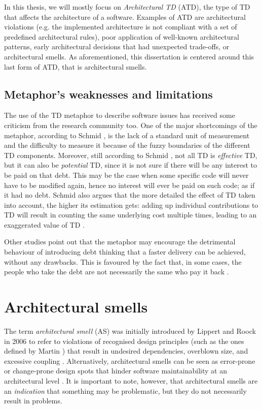 In this thesis, we will mostly focus on \emph{Architectural TD} (ATD), the type of TD that affects the architecture of a software.
Examples of ATD are architectural violations (e.g. the implemented architecture is not compliant with a set of predefined architectural rules), poor application of well-known architectural patterns, early architectural decisions that had unexpected trade-offs, or architectural smells.
As aforementioned, this dissertation is centered around this last form of ATD, that is architectural smells.

\subsection{Metaphor's weaknesses and limitations}
The use of the TD metaphor to describe software issues has received some criticism from the research community too.
One of the major shortcomings of the metaphor, according to Schmid \cite{Schmid2013}, is the lack of a standard unit of measurement and the difficulty to measure it because of the fuzzy boundaries of the different TD components.
Moreover, still according to Schmid \cite{Schmid2013}, not all TD is \textit{effective} TD, but it can also be \textit{potential} TD, since it is not sure if there will be any interest to be paid on that debt.
This may be the case when some specific code will never have to be modified again, hence no interest will ever be paid on such code; as if it had no debt.
Schmid also argues that the more detailed the effect of TD taken into account, the higher its estimation gets: adding up individual contributions to TD will result in counting the same underlying cost multiple times, leading to an exaggerated value of TD \cite{Schmid2013}.

Other studies point out that the metaphor may encourage the detrimental behaviour of introducing debt thinking that a faster delivery can be achieved, without any drawbacks. This is favoured by the fact that, in some cases, the people who take the debt are not necessarily the same who pay it back \cite{Allman2012}.


\section{Architectural smells}
The term \emph{architectural smell} (AS) was initially introduced by Lippert and Roock in 2006 \cite{Lippert2006} to refer to violations of recognised design principles (such as the ones defined by Martin \cite{Martin2018}) that result in undesired dependencies, overblown size, and excessive coupling \cite{Garcia2009}.
Alternatively, architectural smells can be seen as error-prone or change-prone design spots that hinder software maintainability at an architectural level \cite{Mo2015}.
It is important to note, however, that architectural smells are an \emph{indication} that something may be problematic, but they do not necessarily result in problems.

